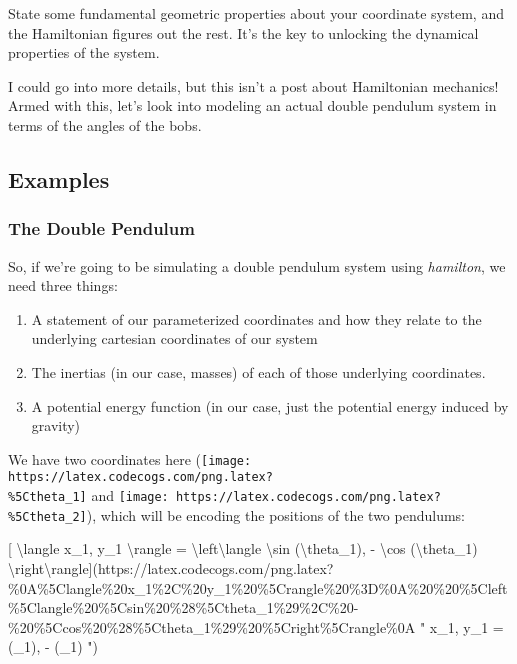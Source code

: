 \documentclass[]{article}
\begin{document}
State some fundamental geometric properties about your coordinate system, and
the Hamiltonian figures out the rest. It's the key to unlocking the dynamical
properties of the system.

I could go into more details, but this isn't a post about Hamiltonian mechanics!
Armed with this, let's look into modeling an actual double pendulum system in
terms of the angles of the bobs.

\hypertarget{examples}{%
\subsection{Examples}\label{examples}}

\hypertarget{the-double-pendulum}{%
\subsubsection{The Double Pendulum}\label{the-double-pendulum}}

So, if we're going to be simulating a double pendulum system using
\emph{hamilton}, we need three things:

\begin{enumerate}
\def\labelenumi{\arabic{enumi}.}
\item
  A statement of our parameterized coordinates and how they relate to the
  underlying cartesian coordinates of our system
\item
  The inertias (in our case, masses) of each of those underlying coordinates.
\item
  A potential energy function (in our case, just the potential energy induced by
  gravity)
\end{enumerate}

We have two coordinates here
(\texttt{[image: https://latex.codecogs.com/png.latex?\\\%5Ctheta\_1]} and
\texttt{[image: https://latex.codecogs.com/png.latex?\\\%5Ctheta\_2]}), which will
be encoding the positions of the two pendulums:

{[} \textbackslash{}langle x\_1, y\_1 \textbackslash{}rangle =
\textbackslash{}left\textbackslash{}langle \textbackslash{}sin
(\textbackslash{}theta\_1), - \textbackslash{}cos (\textbackslash{}theta\_1)
\textbackslash{}right\textbackslash{}rangle{]}(https://latex.codecogs.com/png.latex?\%0A\%5Clangle\%20x\_1\%2C\%20y\_1\%20\%5Crangle\%20\%3D\%0A\%20\%20\%5Cleft\%5Clangle\%20\%5Csin\%20\%28\%5Ctheta\_1\%29\%2C\%20-\%20\%5Ccos\%20\%28\%5Ctheta\_1\%29\%20\%5Cright\%5Crangle\%0A
" \langle x\_1, y\_1 \rangle = \left\langle \sin (\theta\_1), - \cos (\theta\_1)
\right\rangle ")
\end{document}

